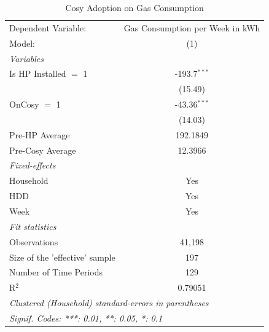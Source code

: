 
\begin{table}[htbp]
   \caption{\label{tab:gascosyhp} Cosy Adoption on Gas Consumption}
   \centering
   \begin{tabular}{lc}
      \tabularnewline \midrule \midrule
      Dependent Variable:            & Gas Consumption per Week in kWh\\  
      Model:                         & (1)\\  
      \midrule
      \emph{Variables}\\
      Is HP Installed $=$ 1          & -193.7$^{***}$\\   
                                     & (15.49)\\   
      OnCosy $=$ 1                   & -43.36$^{***}$\\   
                                     & (14.03)\\   
      \midrule
      Pre-HP Average                 & 192.1849\\  
      Pre-Cosy Average               & 12.3966\\  
\midrule
      \emph{Fixed-effects}\\
      Household                      & Yes\\  
      HDD                            & Yes\\  
      Week                           & Yes\\  
      \midrule
      \emph{Fit statistics}\\
      Observations                   & 41,198\\  
      Size of the 'effective' sample & 197\\  
      Number of Time Periods         & 129\\  
      R$^2$                          & 0.79051\\  
      \midrule \midrule
      \multicolumn{2}{l}{\emph{Clustered (Household) standard-errors in parentheses}}\\
      \multicolumn{2}{l}{\emph{Signif. Codes: ***: 0.01, **: 0.05, *: 0.1}}\\
   \end{tabular}
\end{table}


